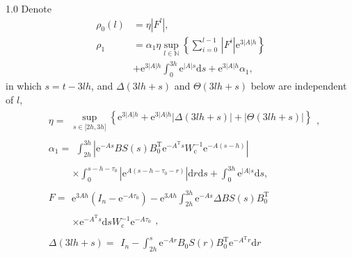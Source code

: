 \documentclass[journal]{IEEEtran}
\begin{document}
\begin{spacing}{1.0}
Denote
\[
\begin{array}{ll}
\rho_{0}(l)  &=  \eta\left\vert F^{l}\right\vert ,\\
\rho_{1}  &=  \alpha_{1}\eta\sup_{l\in%
\mathbb{N}
}\left\{  \sum_{i=0}^{l-1}\,\left\vert F^{i}\right\vert \mathrm{e}%
^{3\left\vert A\right\vert h}\right\} \\
&  +\mathrm{e}^{3\left\vert A\right\vert h}\int_{0}^{3h}\mathrm{e}^{\left\vert
A\right\vert s}\mathrm{d}s+\mathrm{e}^{3\left\vert A\right\vert h}\alpha_{1},
\end{array}
\]
in which $s=t-3lh$, and
$\mathit{\Delta}(3lh+s)$ and $\mathit{\Theta}(3lh+s)$ below are independent
of $l$,
\begin{align}
&\eta=
\begin{array}{ll}
	\sup\limits_{s\in\lbrack2h,3h]}
	\left\{\mathrm{e}^{3|A|h}
	+\mathrm{e}^{3|A|h}|\mathit{\Delta}(3lh+s)|
	+|\mathit{\Theta}(3lh+s)|\right\}
\end{array},\nonumber\\
&\alpha_{1}=
\begin{array}{ll}
	\int_{2h}^{3h}|\mathrm{e}^{-As}BS(s)
	B_{0}^{\mathrm{T}}\mathrm{e}^{-A^{\mathrm{T}}s}
	W_{\mathrm{c}}^{-1}\mathrm{e}^{-A(s-h)}|
\end{array}\nonumber\\
&\qquad\begin{array}{ll}
	\times\int_{0}^{s-h-\tau_{0}}
	|\mathrm{e}^{A(s-h-\tau_{0}-r)}|\mathrm{d}r\mathrm{d}s
	+\int_{0}^{3h}\mathrm{e}^{|A|s}\mathrm{d}s,
\end{array}\label{alpha_01}\\
&\mathit{F}=
\begin{array}{ll}
	\mathrm{e}^{3Ah}(I_{n}-\mathrm{e}^{-A\tau_{0}})
	-\mathrm{e}^{3Ah}\int_{2h}^{3h}
	\mathrm{e}^{-As}\mathit{\Delta}B S(s)B_{0}^{\mathrm{T}}
\end{array}\nonumber\\
&\qquad\begin{array}{ll}
	\times \mathrm{e}^{-A^{\mathrm{T}}s}\mathrm{d}sW_{\mathrm{c}}^{-1}
	\mathrm{e}^{-A\tau_{0}}
\end{array},\label{F_def}\\
&\mathit{\Delta}(3lh+s)=
\begin{array}{ll}
	I_{n}-\int_{2h}^{s}\mathrm{e}^{-Ar}B_{0}
	S(r)B_{0}^{\mathrm{T}}\mathrm{e}^{-A^{\mathrm{T}}r}
	\mathrm{d}r
\end{array}\nonumber\\
&\qquad\begin{array}{ll}

\end{array}
\end{align}
\end{spacing}
\end{document}
